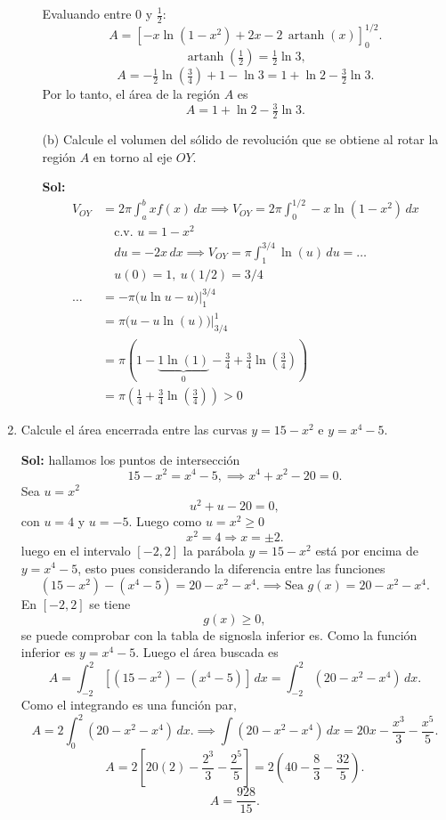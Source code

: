\documentclass[letterpaper,12pt]{article}
\theoremstyle{plain}
\theoremstyle{definition}
\begin{document}
\begin{enumerate}
\begin{enumerate}
Evaluando entre $0$ y $\tfrac12$:
\[
A=\left[-x\ln(1-x^2)+2x-2\,\operatorname{artanh}(x)\right]_{0}^{1/2}.
\]
\[
\operatorname{artanh}\!\left(\tfrac12\right)=\tfrac12\ln 3,
\]
\[
A=-\tfrac12\ln\!\left(\tfrac34\right)+1-\ln 3
=1+\ln 2-\tfrac32\ln 3.
\]
Por lo tanto, el área de la región $A$ es
\[
A=1+\ln 2-\tfrac{3}{2}\ln 3.
\]
    \color{black}
    \item[(b)] Calcule el volumen del sólido de revolución que se obtiene al rotar la región $A$ en torno al eje $OY$.

\color{blue}
\textbf{Sol:} \[
\begin{aligned}
V_{OY} &= 2\pi \int_{a}^{b} x f(x) \, dx \implies V_{OY} = 2\pi \int_{0}^{1/2} -x \ln(1-x^2) \, dx \\
&\quad \text{c.v. } u = 1-x^2 \\
&\quad du = -2x \, dx \implies V_{OY} = \pi \int_{1}^{3/4} \ln(u) \, du = \dots \\
&\quad u(0)=1, \ u(1/2)=3/4 \\
\dots &= -\pi \Big( u \ln u - u \Big) \bigg|_{1}^{3/4} \\
&= \pi \Big( u - u \ln(u) \Big) \bigg|_{3/4}^{1} \\
&= \pi \left( 1 - \underbrace{1 \ln(1)}_{0} - \frac{3}{4} + \frac{3}{4} \ln\left(\frac{3}{4}\right) \right) \\
&= \pi \left( \frac{1}{4} + \frac{3}{4} \ln\left(\frac{3}{4}\right) \right) > 0
\end{aligned}
\]
\color{black}

    
\end{enumerate}
\item Calcule el \'area encerrada entre las curvas $y = 15 - x^2$ e $y = x^4 - 5$.

\color{blue}
\textbf{Sol:} hallamos los puntos de intersección
\[
15 - x^2 = x^4 - 5,
\implies
x^4 + x^2 - 20 = 0.
\]
Sea $u = x^2$
\[
u^2 + u - 20 = 0,
\]
con $u = 4$ y $u = -5$. Luego como $u = x^2 \ge 0$
\[
x^2 = 4 \Rightarrow x = \pm 2.
\]
luego en el intervalo $[-2,2]$ la parábola $y=15-x^2$ está por encima de
$y=x^4-5$, esto pues considerando la diferencia entre las funciones
\[
(15-x^2)-(x^4-5)=20-x^2-x^4.
\implies \text{Sea }
g(x)=20-x^2-x^4.
\]
En $[-2,2]$ se tiene
\[
g(x)\ge 0,
\]
se puede comprobar con la tabla de signosla inferior es. Como la función inferior es
$y = x^4 - 5$. Luego el área buscada es
\[
A = \int_{-2}^{2} \left[(15 - x^2) - (x^4 - 5)\right]\,dx
= \int_{-2}^{2} (20 - x^2 - x^4)\,dx.
\]
Como el integrando es una función par,
\[
A = 2 \int_{0}^{2} (20 - x^2 - x^4)\,dx.
\implies 
\int (20 - x^2 - x^4)\,dx
= 20x - \frac{x^3}{3} - \frac{x^5}{5}.
\]
\[
A = 2\left[20(2) - \frac{2^3}{3} - \frac{2^5}{5}\right]
= 2\left(40 - \frac{8}{3} - \frac{32}{5}\right).
\]
\[
A = \frac{928}{15}.
\]
\color{black}




\end{enumerate}
\end{document}
